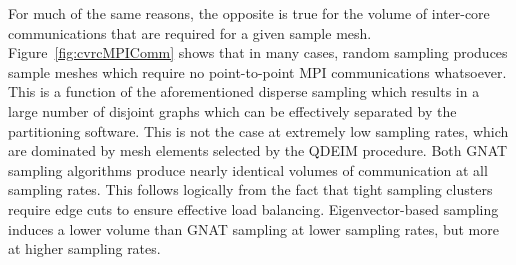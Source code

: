 For much of the same reasons, the opposite is true for the volume of inter-core communications that are required for a given sample mesh. Figure~\ref{fig:cvrcMPIComm} shows that in many cases, random sampling produces sample meshes which require no point-to-point MPI communications whatsoever. This is a function of the aforementioned disperse sampling which results in a large number of disjoint graphs which can be effectively separated by the partitioning software. This is not the case at extremely low sampling rates, which are dominated by mesh elements selected by the QDEIM procedure. Both GNAT sampling algorithms produce nearly identical volumes of communication at all sampling rates. This follows logically from the fact that tight sampling clusters require edge cuts to ensure effective load balancing. Eigenvector-based sampling induces a lower volume than GNAT sampling at lower sampling rates, but more at higher sampling rates. 


